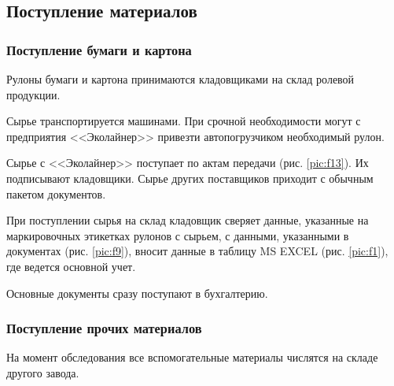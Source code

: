 \newpage
\subsection{Поступление материалов}
\label{bp:MatInput}
%


\subsubsection{Поступление бумаги и картона}

Рулоны бумаги и картона принимаются кладовщиками на склад ролевой продукции. 

Сырье транспортируется машинами. При срочной необходимости могут с предприятия <<Эколайнер>>  привезти автопогрузчиком необходимый рулон. 

Сырье с <<Эколайнер>> поступает по актам передачи (рис. \ref{pic:f13}). Их подписывают кладовщики. Сырье других поставщиков приходит с обычным пакетом документов. 

При поступлении сырья на склад кладовщик сверяет данные, указанные на маркировочных этикетках рулонов с сырьем, с данными, указанными в документах (рис. \ref{pic:f9}), вносит данные в таблицу MS EXCEL (рис. \ref{pic:f1}), где ведется основной учет. 

Основные документы сразу поступают в бухгалтерию.










\subsubsection{Поступление прочих материалов}

На момент обследования все вспомогательные материалы числятся на складе другого завода.



